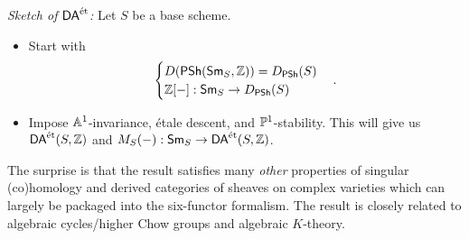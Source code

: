 \emph{Sketch of $\DAet$:} Let $S$ be a base scheme.
\begin{itemize}
	\item Start with
		\[
		\begin{cases}
			D(\PSh(\cat{Sm}_S, \Z)) = D_{\PSh}(S) \\
			\Z[-]: \cat{Sm}_S \to D_{\PSh}(S)
		\end{cases}
		.\] 
	\item Impose $\Aff^{1}$-invariance, \'etale descent, and $\P^{1}$-stability. This will give us $\DAet(S,\Z)$ and $M_S(-):\cat{Sm}_S\to \DAet(S,\Z)$.
\end{itemize}
The surprise is that the result satisfies many \emph{other} properties of singular (co)homology and derived categories of sheaves on complex varieties which can largely be packaged into the six-functor formalism. The result is closely related to algebraic cycles/higher Chow groups and algebraic $K$-theory.



